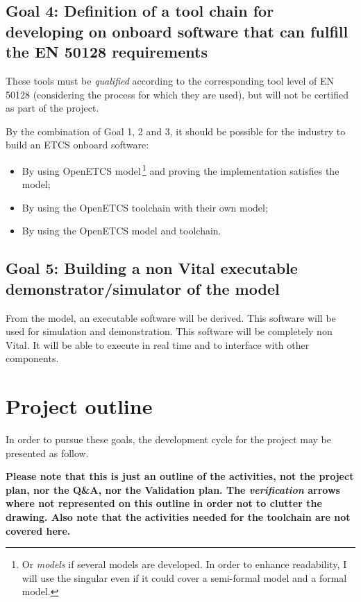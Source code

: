 \documentclass{template/openetcs_article}
\begin{document}
\subsection{Goal 4: Definition of a tool chain for developing on onboard software that can fulfill the EN 50128 
requirements}
These tools must be \emph{qualified} according to the corresponding tool level of EN 50128 (considering the 
process for which they are used), but will not be certified as part of the project.

By the combination of Goal 1, 2 and 3, it should be possible for the industry to build an ETCS 
onboard software:
\begin{itemize}
\item By using OpenETCS model\,\footnote{Or \emph{models} if several models are developed. In order to enhance readability,
I will use the singular even if it could cover a semi-formal model and a formal model.} and proving the implementation satisfies 
the model;
\item By using the OpenETCS toolchain with their own model;
\item By using the OpenETCS model and toolchain.
\end{itemize}

\subsection{Goal 5: Building a non Vital executable demonstrator/simulator of the model}
From the model, an executable software will be derived. This software will be used for simulation and 
demonstration. This software will be completely non Vital. It will be able to execute in real time and to 
interface with other components. 

\section{Project outline}
In order to pursue these goals, the development cycle for the project may be presented as follow. 

\textbf{Please note that this is just an outline of the activities, not the project plan, nor the 
Q\&A, nor the Validation plan. The \emph{verification} arrows where not represented on this outline in order 
not to clutter the drawing. Also note that the activities needed for the toolchain are not
covered here.}
\end{document}
